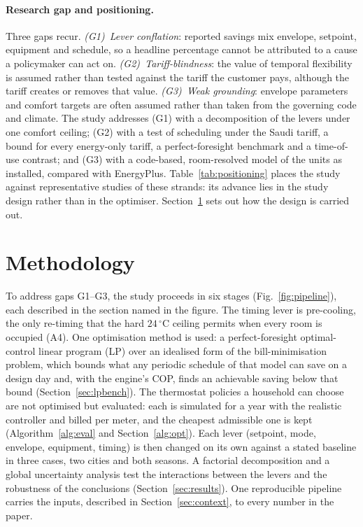 \documentclass[10pt,a4paper,twocolumn]{article}
\theoremstyle{definition}
\begin{document}
\paragraph{Research gap and positioning.}
Three gaps recur. \emph{(G1)~Lever conflation}: reported savings mix envelope, setpoint, equipment and schedule, so a headline percentage cannot be attributed to a cause a policymaker can act on. \emph{(G2)~Tariff-blindness}: the value of temporal flexibility is assumed rather than tested against the tariff the customer pays, although the tariff creates or removes that value. \emph{(G3)~Weak grounding}: envelope parameters and comfort targets are often assumed rather than taken from the governing code and climate. The study addresses (G1) with a decomposition of the levers under one comfort ceiling; (G2) with a test of scheduling under the Saudi tariff, a bound for every energy-only tariff, a perfect-foresight benchmark and a time-of-use contrast; and (G3) with a code-based, room-resolved model of the units as installed, compared with EnergyPlus. Table~\ref{tab:positioning} places the study against representative studies of these strands: its advance lies in the study design rather than in the optimiser. Section~\ref{sec:methodology} sets out how the design is carried out.

\section{Methodology}\label{sec:methodology}
To address gaps G1--G3, the study proceeds in six stages (Fig.~\ref{fig:pipeline}), each described in the section named in the figure. The timing lever is pre-cooling, the only re-timing that the hard $24\,^{\circ}$C ceiling permits when every room is occupied (A4). One optimisation method is used: a perfect-foresight optimal-control linear program (LP) over an idealised form of the bill-minimisation problem, which bounds what any periodic schedule of that model can save on a design day and, with the engine's COP, finds an achievable saving below that bound (Section~\ref{sec:lpbench}). The thermostat policies a household can choose are not optimised but evaluated: each is simulated for a year with the realistic controller and billed per meter, and the cheapest admissible one is kept (Algorithm~\ref{alg:eval} and Section~\ref{alg:opt}). Each lever (setpoint, mode, envelope, equipment, timing) is then changed on its own against a stated baseline in three cases, two cities and both seasons. A factorial decomposition and a global uncertainty analysis test the interactions between the levers and the robustness of the conclusions (Section~\ref{sec:results}). One reproducible pipeline carries the inputs, described in Section~\ref{sec:context}, to every number in the paper.
\end{document}

